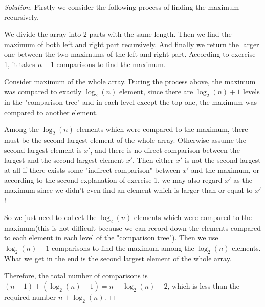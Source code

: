 \begin{proof}[Solution]
    Firstly we consider the following process of finding the maximum recursively.
    
    We divide the array into 2 parts with the same length. Then we find the maximum of both left and right part recursively. And finally we return the larger one between the two maximums of the left and right part. According to exercise 1, it takes $n - 1$ comparisons to find the maximum.
    
    Consider maximum of the whole array. During the process above, the maximum was compared to exactly $\log_2(n)$ element, since there are $\log_2(n) + 1$ levels in the "comparison tree" and in each level except the top one, the maximum was compared to another element.
    
    Among the $\log_2(n)$ elements which were compared to the maximum, there must be the second largest element of the whole array. Otherwise assume the second largest element is $x'$, and there is no direct comparison between the largest and the second largest element $x'$. Then either $x'$ is not the second largest at all if there exists some "indirect comparison" between $x'$ and the maximum, or according to the second explanation of exercise 1, we may also regard $x'$ as the maximum since we didn't even find an element which is larger than or equal to $x'$!
    
    So we just need to collect the $\log_2(n)$ elements which were compared to the maximum(this is not difficult because we can record down the elements compared to each element in each level of the "comparison tree"). Then we use $\log_2(n) - 1$ comparisons to find the maximum among the $\log_2(n)$ elements. What we get in the end is the second largest element of the whole array.
    
    Therefore, the total number of comparisons is $(n - 1) + (\log_2(n) - 1) = n + \log_2(n) - 2$, which is less than the required number $n + \log_2(n)$.
\end{proof}

